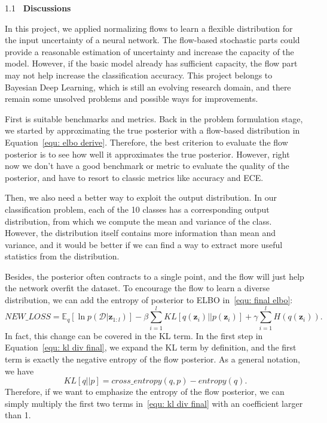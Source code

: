 \documentclass[a4paper,11pt]{article} %
\newcommand{\lineSpace}{1.1}
\newcounter{rSection}
\newenvironment{rSection}[1]{ %
\refstepcounter{rSection}
\begin{spacing}{\lineSpace}
  {\bf \large \therSection~#1 \hfill}  %
	\vspace{0.25em}

}{
\vspace{1em}
\end{spacing}
}
\begin{document}
\begin{rSection}{Discussions}

In this project, we applied normalizing flows to learn a flexible distribution for the input uncertainty of a neural network.
The flow-based stochastic parts could provide a reasonable estimation of uncertainty and increase the capacity of the model. 
However, if the basic model already has sufficient capacity, the flow part may not help increase the classification accuracy. 
This project belongs to Bayesian Deep Learning, which is still an evolving research domain, and there remain some unsolved problems and possible ways for improvements.

First is suitable benchmarks and metrics. 
Back in the problem formulation stage, we started by approximating the true posterior with a flow-based distribution in Equation~\ref{equ: elbo derive}.
Therefore, the best criterion to evaluate the flow posterior is to see how well it approximates the true posterior. 
However, right now we don't have a good benchmark or metric to evaluate the quality of the posterior, and have to resort to classic metrics like accuracy and ECE.

Then, we also need a better way to exploit the output distribution.
In our classification problem, each of the 10 classes has a corresponding output distribution, from which we compute the mean and variance of the class. 
However, the distribution itself contains more information than mean and variance, and it would be better if we can find a way to extract more useful statistics from the distribution. 

Besides, the posterior often contracts to a single point, and the flow will just help the network overfit the dataset.
To encourage the flow to learn a diverse distribution, we can add the entropy of posterior to ELBO in~\ref{equ: final elbo}:
\begin{equation}
	\label{equ: modified elbo}
	NEW\_LOSS 
	=
	\mathbb{E}_q[\ln p(\mathcal{D}|\mathbf{z}_{1:l})] - \beta \sum_{i=1}^{l} KL[q(\mathbf{z}_{i}) || p(\mathbf{z}_{i})] 
	+ \gamma \sum_{i=1}^{l} H(q(\mathbf{z}_{i})).
\end{equation}
In fact, this change can be covered in the KL term. 
In the first step in Equation~\ref{equ: kl div final}, we expand the KL term by definition, and the first term is exactly the negative entropy of the flow posterior.
As a general notation, we have 
\begin{equation}
	KL[q||p] = cross\_entropy(q, p) - entropy(q).
\end{equation}
Therefore, if we want to emphasize the entropy of the flow posterior, we can simply multiply the first two terms in~\ref{equ: kl div final} with an coefficient larger than 1. 

\end{rSection}

\clearpage
% 

% 


\clearpage
\end{document}
